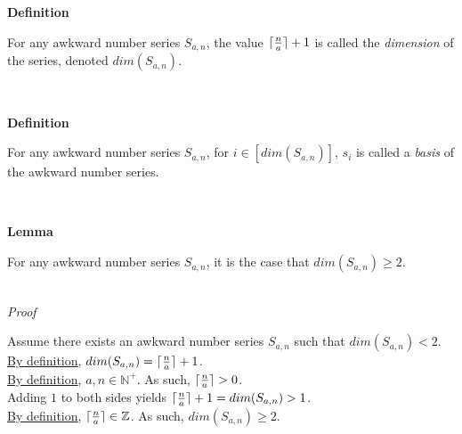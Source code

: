 \documentclass[a4paper,12pt]{article}
\DeclarePairedDelimiter{\ceil}{\lceil}{\rceil}
\begin{document}
\label{definition:dimension}
\hypertarget{definition:dimension}{}
\begin{tcolorbox}
\textbf{Definition}

For any awkward number series $S_{a,n}$, the value $\ceil{\frac{n}{a}} + 1$ is called the \textit{dimension} of the series, denoted $dim(S_{a, n})$.

\end{tcolorbox}
\noindent \\







\label{definition:basis}
\hypertarget{definition:basis}{}
\begin{tcolorbox}
\textbf{Definition}

For any awkward number series $S_{a,n}$, for $i \in [dim(S_{a,n})]$, $s_i$ is called a \textit{basis} of the awkward number series.

\end{tcolorbox}
\noindent \\






\label{lemma:min_dimension}
\hypertarget{lemma:min_dimension}{}
\begin{tcolorbox}
\textbf{Lemma}

For any awkward number series $S_{a, n}$, it is the case that $dim(S_{a, n}) \geq 2$.

\end{tcolorbox}

\noindent \\
\textit{Proof}

\noindent Assume there exists an awkward number series $S_{a, n}$ such that $dim(S_{a, n}) < 2$.\\

\noindent \hyperlink{definition:dimension}{By definition}, $dim(S_{a, n}) = \ceil{\frac{n}{a}} + 1$.\\

\noindent \hyperlink{definition:awkward_number_series}{By definition}, $a, n \in \mathbb{N}^+$. As such, $\ceil{\frac{n}{a}} > 0$.\\

\noindent Adding $1$ to both sides yields $\ceil{\frac{n}{a}} + 1 = dim(S_{a, n}) > 1$.\\

\noindent \hyperlink{definition:ceiling_function}{By definition}, $\ceil{\frac{n}{a}} \in \mathbb{Z}$. As such, $dim(S_{a, n}) \geq 2$. 
\end{document}

